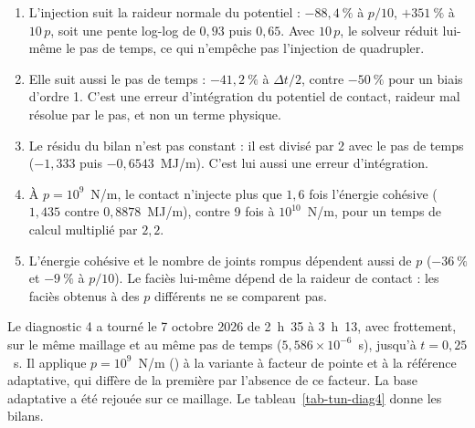\begin{enumerate}
\item L'injection suit la raideur normale du potentiel : $-88{,}4~\%$ à $p/10$, $+351~\%$ à $10\,p$, soit une pente log-log de $0{,}93$ puis $0{,}65$. Avec $10\,p$, le solveur réduit lui-même le pas de temps, ce qui n'empêche pas l'injection de quadrupler.
\item Elle suit aussi le pas de temps : $-41{,}2~\%$ à $\Delta t/2$, contre $-50~\%$ pour un biais d'ordre 1. C'est une erreur d'intégration du potentiel de contact, raideur mal résolue par le pas, et non un terme physique.
\item Le résidu du bilan n'est pas constant : il est divisé par 2 avec le pas de temps ($-1{,}333$ puis $-0{,}6543$~MJ/m). C'est lui aussi une erreur d'intégration.
\item À $p = 10^9$~N/m, le contact n'injecte plus que $1{,}6$ fois l'énergie cohésive ($1{,}435$ contre $0{,}8878$~MJ/m), contre 9 fois à $10^{10}$~N/m, pour un temps de calcul multiplié par $2{,}2$.
\item L'énergie cohésive et le nombre de joints rompus dépendent aussi de $p$ ($-36~\%$ et $-9~\%$ à $p/10$). Le faciès lui-même dépend de la raideur de contact : les faciès obtenus à des $p$ différents ne se comparent pas.
\end{enumerate}

Le diagnostic 4 a tourné le 7 octobre 2026 de 2~h~35 à 3~h~13, avec frottement, sur le même maillage et au même pas de temps ($5{,}586\times10^{-6}$~s), jusqu'à $t = 0{,}25$~s. Il applique $p = 10^9$~N/m () à la variante à facteur de pointe et à la référence adaptative, qui diffère de la première par l'absence de ce facteur. La base adaptative a été rejouée sur ce maillage. Le tableau~\ref{tab-tun-diag4} donne les bilans.

